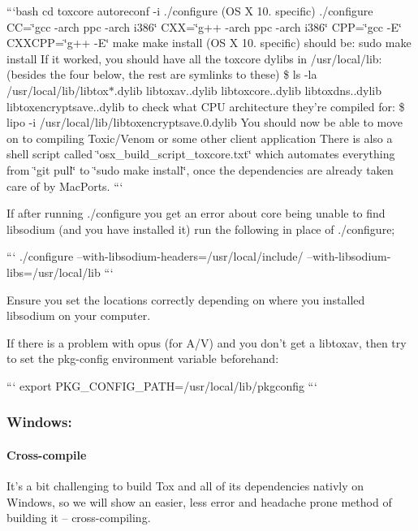 ```bash cd toxcore autoreconf -\/i ./configure (O\+S X 10. specific) ./configure C\+C=\char`\"{}gcc -\/arch ppc -\/arch i386\char`\"{} C\+X\+X=\char`\"{}g++ -\/arch ppc -\/arch i386\char`\"{} C\+P\+P=\char`\"{}gcc -\/\+E\char`\"{} C\+X\+X\+C\+P\+P=\char`\"{}g++ -\/\+E\char`\"{} make make install (O\+S X 10. specific) should be\+: sudo make install If it worked, you should have all the toxcore dylibs in /usr/local/lib\+: (besides the four below, the rest are symlinks to these) \$ ls -\/la /usr/local/lib/libtox$\ast$.dylib libtoxav..\+dylib libtoxcore..\+dylib libtoxdns..\+dylib libtoxencryptsave..\+dylib to check what C\+P\+U architecture they're compiled for\+: \$ lipo -\/i /usr/local/lib/libtoxencryptsave.0.\+dylib You should now be able to move on to compiling Toxic/\+Venom or some other client application There is also a shell script called \char`\"{}osx\+\_\+build\+\_\+script\+\_\+toxcore.\+txt\char`\"{} which automates everything from \char`\"{}git pull\char`\"{} to \char`\"{}sudo make install\char`\"{}, once the dependencies are already taken care of by Mac\+Ports. ```

If after running ./configure you get an error about core being unable to find libsodium (and you have installed it) run the following in place of ./configure;

``` ./configure --with-\/libsodium-\/headers=/usr/local/include/ --with-\/libsodium-\/libs=/usr/local/lib ```

Ensure you set the locations correctly depending on where you installed libsodium on your computer.

If there is a problem with opus (for A/\+V) and you don't get a libtoxav, then try to set the pkg-\/config environment variable beforehand\+:

``` export P\+K\+G\+\_\+\+C\+O\+N\+F\+I\+G\+\_\+\+P\+A\+T\+H=/usr/local/lib/pkgconfig ```

\label{_windows}%
 \subsubsection*{Windows\+:}

\label{_windows-cross-compile}%


\paragraph*{Cross-\/compile}

It's a bit challenging to build Tox and all of its dependencies nativly on Windows, so we will show an easier, less error and headache prone method of building it -- cross-\/compiling.

